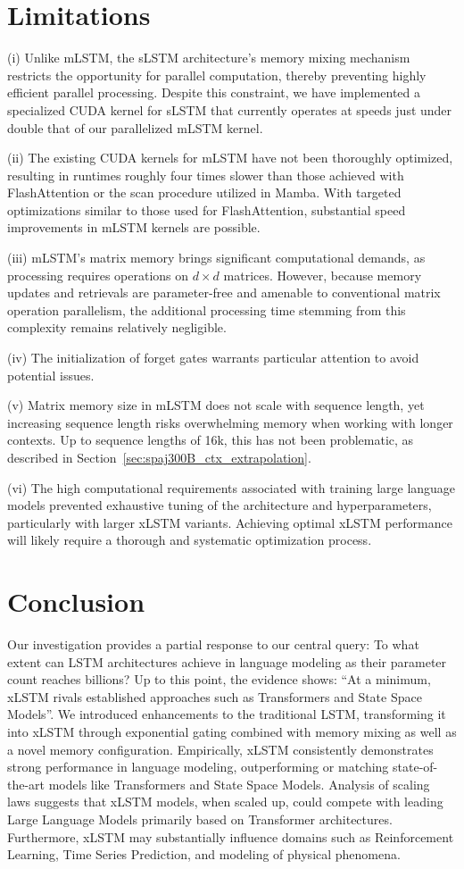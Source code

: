 \section{Limitations}

(i) Unlike mLSTM, the sLSTM architecture's memory mixing mechanism restricts the opportunity for parallel computation, thereby preventing highly efficient parallel processing. Despite this constraint, we have implemented a specialized CUDA kernel for sLSTM that currently operates at speeds just under double that of our parallelized mLSTM kernel.

(ii) The existing CUDA kernels for mLSTM have not been thoroughly optimized, resulting in runtimes roughly four times slower than those achieved with FlashAttention or the scan procedure utilized in Mamba. With targeted optimizations similar to those used for FlashAttention, substantial speed improvements in mLSTM kernels are possible.

(iii) mLSTM's matrix memory brings significant computational demands, as processing requires operations on $d \times d$ matrices. However, because memory updates and retrievals are parameter-free and amenable to conventional matrix operation parallelism, the additional processing time stemming from this complexity remains relatively negligible.

(iv) The initialization of forget gates warrants particular attention to avoid potential issues.

(v) Matrix memory size in mLSTM does not scale with sequence length, yet increasing sequence length risks overwhelming memory when working with longer contexts. Up to sequence lengths of 16k, this has not been problematic, as described in Section~\ref{sec:spaj300B_ctx_extrapolation}.

(vi) The high computational requirements associated with training large language models prevented exhaustive tuning of the architecture and hyperparameters, particularly with larger xLSTM variants. Achieving optimal xLSTM performance will likely require a thorough and systematic optimization process.

\section{Conclusion}
Our investigation provides a partial response to our central query: To what extent can LSTM architectures achieve in language modeling as their parameter count reaches billions? Up to this point, the evidence shows: ``At a minimum, xLSTM rivals established approaches such as Transformers and State Space Models''. We introduced enhancements to the traditional LSTM, transforming it into xLSTM through exponential gating combined with memory mixing as well as a novel memory configuration. Empirically, xLSTM consistently demonstrates strong performance in language modeling, outperforming or matching state-of-the-art models like Transformers and State Space Models. Analysis of scaling laws suggests that xLSTM models, when scaled up, could compete with leading Large Language Models primarily based on Transformer architectures. Furthermore, xLSTM may substantially influence domains such as Reinforcement Learning, Time Series Prediction, and modeling of physical phenomena.

